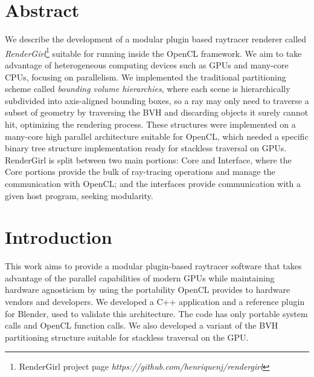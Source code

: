 \documentclass[a0,portrait]{a0poster}
\begin{document}
\begin{multicols}{2} %



\color{Navy} %

\section*{Abstract}

We describe the development of a modular plugin based raytracer
renderer called \emph{RenderGirl}\footnote{RenderGirl project page
  \emph{https://github.com/henriquenj/rendergirl}} suitable for
running inside the OpenCL framework. We aim to take advantage of
heterogeneous computing devices such as GPUs and many-core CPUs,
focusing on parallelism. We implemented the traditional partitioning
scheme called \emph{bounding volume hierarchies}, where each scene is
hierarchically subdivided into axis-aligned bounding boxes, so a ray
may only need to traverse a subset of geometry by traversing the BVH
and discarding objects it surely cannot hit, optimizing the rendering
process. These structures were implemented on a many-core high
parallel architecture suitable for OpenCL, which needed a specific
binary tree structure implementation ready for stackless traversal on
GPUs. RenderGirl is split between two main portions: Core and
Interface, where the Core portions provide the bulk of ray-tracing
operations and manage the communication with OpenCL; and the
interfaces provide communication with a given host program, seeking
modularity.


\color{Black} %
\normalsize
\section*{Introduction}

This work aims to provide a modular plugin-based raytracer software
that takes advantage of the parallel capabilities of modern GPUs while
maintaining hardware agnosticism by using the portability OpenCL
provides to hardware vendors and developers. We developed a C++
application and a reference plugin for Blender, used to validate this
architecture. The code has only portable system calls and OpenCL
function calls. We also developed a variant of the BVH partitioning
structure suitable for stackless traversal on the GPU.


\end{multicols}
\end{document}
